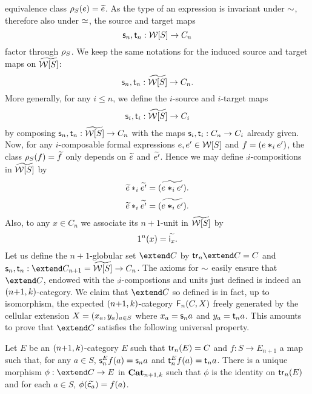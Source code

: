   equivalence class $\rho_{S}(e)=\widetilde{e}$. As the type of an
  expression is invariant under $\sim$, therefore also under $\simeq$, 
 the source and target maps
  \[\mathsf{s}_{n},\mathsf{t}_{n}:\mathcal{W}[S]\to C_n\]
  factor through $\rho_{S}$. We keep the same notations for the induced
  source and target maps on $\widetilde{\mathcal{W}[S]}$:
  \[\mathsf{s}_{n},\mathsf{t}_{n}:\widetilde{\mathcal{W}[S]}\to C_n.\]
  More generally, for any $i\leq n$, we define the $i$-source and
  $i$-target maps
  \[\mathsf{s}_{i},\mathsf{t}_{i}:\widetilde{\mathcal{W}[S]}\to C_i\]
  by composing $\mathsf{s}_{n},\mathsf{t}_{n}:\widetilde{\mathcal{W}[S]}\to C_n$ with the maps $\mathsf{s}_{i},\mathsf{t}_{i}:C_n\to C_i$ already given. Now, for any $i$-composable formal expressions
  $e,e'\in \mathcal{W}[S]$ and $f=(e\bm{\ast}_{i} e')$, the class $\rho_{S}(f)=\widetilde{f}$ only
  depends on $\widetilde{e}$ and $\widetilde{e'}$. Hence we may define 
 $\comp i$-compositions in $\widetilde{\mathcal{W}[S]}$ by
 \[\widetilde{e}\ast_{i}\widetilde{e'}=\widetilde{(e\bm{\ast}_{i} e')}.\]
 \[\widetilde{e}\ast_{i}\widetilde{e'}=\widetilde{(e\bm{\ast}_{i} e')}.\]
 Also, to any $x\in C_n$ we associate its $n{+}1$-unit in $\widetilde{\mathcal{W}[S]}$ by
  \[1^{n}(x)=\widetilde{\mathsf{i}_{x}}.\]
  Let us define the $n{+}1$-globular set $\extend C$ by
  $\trk n\extend C=C$ and $\sce n,\tge n:\extend C_{n+1}=\wtxeq S\to C_n$.
  The axioms for $\sim$ easily ensure that $\extend C$, endowed with
  the $\comp i$-compostions and units just defined is indeed an
  $(n{+}1,k)$-category. We claim that $\extend C$ so defined is
  in fact, up to isomorphism, the expected $(n{+}1,k)$-category
  $\mathsf{F}_{n}(C,X)$ freely generated by the cellular extension
  $X=(x_a,y_a)_{a\in S}$ where $x_a=\mathsf{s}_{n} a$ and $y_a=\mathsf{t}_{n}
  a$. This amounts to prove that $\extend C$ satisfies the following universal property.
  
\begin{proposition}\label{prop:univprop}
   Let $E$ be an  $(n{+}1,k)$-category $E$ such that $\mathsf{tr}_{n}(E)=C$
   and  $f:S\to E_{n+1}$ a map such that, for any $a\in S$, $\mathsf{s}_{n}^Ef(a)=\mathsf{s}_{n} a$
    and $\mathsf{t}_{n}^E f(a)=\mathsf{t}_{n} a$.  There is a unique
    morphism $\phi:\extend C\to E$ in $\mathbf{Cat}_{n+1,k}$ such that $\phi$ is the
    identity on $\mathsf{tr}_{n}(E)$ and for each $a\in S$, $\phi(\widetilde{\mathsf{c}_{a}})=f(a)$.
  \end{proposition}
  
  
 

 
 








 
 
 
